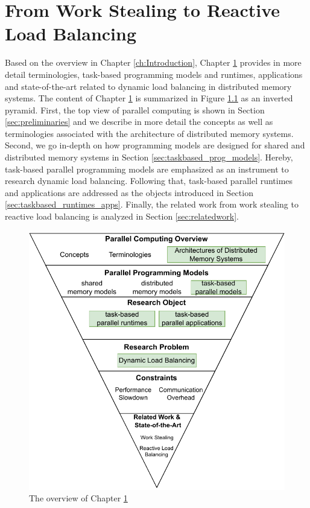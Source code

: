 \chapter{From Work Stealing to Reactive Load Balancing}
\label{ch:wstoreactlb}
\chaptertoc
\noindent

Based on the overview in Chapter \ref{ch:Introduction}, Chapter \ref{ch:wstoreactlb} provides in more detail terminologies, task-based programming models and runtimes, applications and state-of-the-art related to dynamic load balancing in distributed memory systems. The content of Chapter \ref{ch:wstoreactlb} is summarized in Figure \ref{fig:chapter_two_overview} as an inverted pyramid. First, the top view of parallel computing is shown in Section \ref{sec:preliminaries} and we describe in more detail the concepts as well as terminologies associated with the architecture of distributed memory systems. Second, we go in-depth on how programming models are designed for shared and distributed memory systems in Section \ref{sec:taskbased_prog_models}. Hereby, task-based parallel programming models are emphasized as an instrument to research dynamic load balancing. Following that, task-based parallel runtimes and applications are addressed as the objects introduced in Section \ref{sec:taskbased_runtimes_apps}. Finally, the related work from work stealing to reactive load balancing is analyzed in Section \ref{sec:relatedwork}.

\begin{figure}[h]
  \centering
  \includegraphics[scale=0.75]{./pictures/preliminaries/preli_parallelcomp_overview.pdf}
	\caption{The overview of Chapter \ref{ch:wstoreactlb}}
	\label{fig:chapter_two_overview}
\end{figure}

